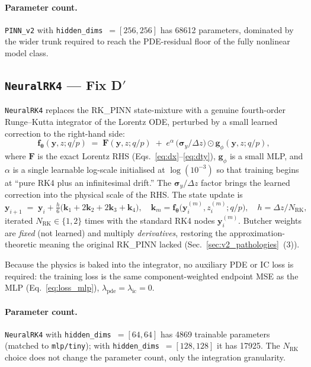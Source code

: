 \documentclass[a4paper,11pt]{article}
\newcommand{\num}[1]{#1}
\newcommand{\dz}{\Delta z}
\newcommand{\state}{\mathbf{y}}
\newcommand{\btheta}{\bm{\theta}}
\begin{document}
\paragraph{Parameter count.}
\texttt{PINN\_v2} with \texttt{hidden\_dims}~$= [256, 256]$ has
\num{68612} parameters, dominated by the wider trunk required to
reach the PDE-residual floor of the fully nonlinear model class.

\subsection{\texttt{NeuralRK4} --- Fix D$'$}
\label{sec:neural_rk4}

\texttt{NeuralRK4} replaces the RK\_PINN state-mixture with a genuine
fourth-order Runge--Kutta integrator of the Lorentz ODE, perturbed by a
small learned correction to the right-hand side:
\begin{equation}
  \mathbf{f}_\btheta(\state, z; q/p)
  \;=\;
  \mathbf{F}(\state, z; q/p)
  \;+\;
  e^{\alpha}\,\bigl(\bm{\sigma}_y / \dz\bigr) \odot
  \mathbf{g}_\phi(\state, z; q/p),
  \label{eq:neural_rk4_rhs}
\end{equation}
where $\mathbf{F}$ is the exact Lorentz RHS
(Eqs.~\ref{eq:dx}--\ref{eq:dty}), $\mathbf{g}_\phi$ is a small MLP, and
$\alpha$ is a single learnable log-scale initialised at $\log(10^{-3})$
so that training begins at ``pure RK4 plus an infinitesimal drift.''  The
$\bm{\sigma}_y / \dz$ factor brings the learned correction into the
physical scale of the RHS.  The state update is
\begin{equation}
  \state_{i+1} \;=\; \state_i
    + \tfrac{h}{6}\bigl( \mathbf{k}_1 + 2\mathbf{k}_2 + 2\mathbf{k}_3 + \mathbf{k}_4 \bigr),
  \quad
  \mathbf{k}_m = \mathbf{f}_\btheta\bigl(\state_i^{(m)}, z_i^{(m)}; q/p\bigr),
  \quad
  h = \dz / N_\text{RK},
  \label{eq:neural_rk4_step}
\end{equation}
iterated $N_\text{RK} \in \{1, 2\}$ times with the standard RK4 nodes
$\state_i^{(m)}$.  Butcher weights are \emph{fixed} (not learned) and
multiply \emph{derivatives}, restoring the approximation-theoretic meaning
the original RK\_PINN lacked (Sec.~\ref{sec:v2_pathologies}~(3)).

Because the physics is baked into the integrator, no auxiliary PDE or IC
loss is required: the training loss is the same component-weighted
endpoint MSE as the MLP (Eq.~\ref{eq:loss_mlp}),
$\lambda_\text{pde} = \lambda_\text{ic} = 0$.

\paragraph{Parameter count.}
\texttt{NeuralRK4} with \texttt{hidden\_dims}~$= [64, 64]$ has \num{4869}
trainable parameters (matched to \texttt{mlp/tiny}); with
\texttt{hidden\_dims}~$= [128, 128]$ it has \num{17925}.  The
$N_\text{RK}$ choice does not change the parameter count, only the
integration granularity.
\end{document}
